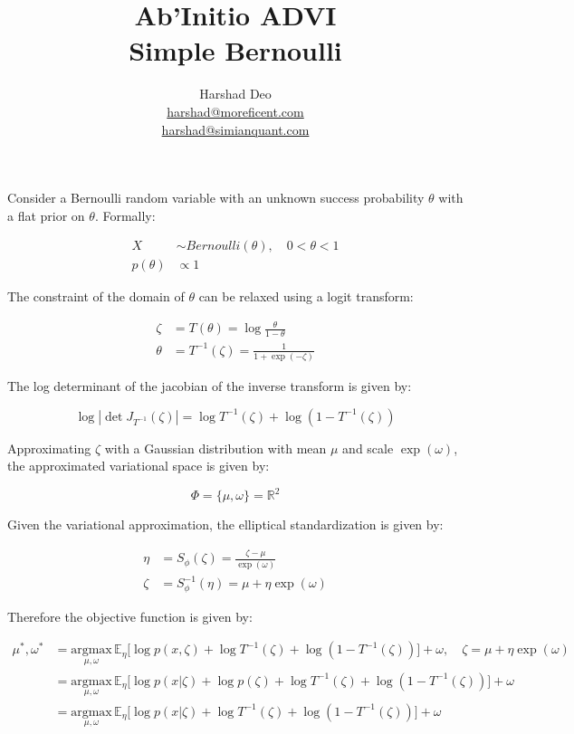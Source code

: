 \documentclass[10pt]{article}
\title{Ab'Initio ADVI \\ Simple Bernoulli}
\author{Harshad Deo \\ 
  \href{mailto:harshad@moreficent.com}{harshad@moreficent.com} \\ 
  \href{mailto:harshad@simianquant.com}{harshad@simianquant.com}
}
\date{}
\begin{document}
  
\maketitle

Consider a Bernoulli random variable with an unknown success probability $\theta$ with a flat prior on $\theta$. Formally:

\begin{align*}
  X &\sim Bernoulli(\theta), \quad 0 < \theta <1\\
  p(\theta) &\varpropto 1
\end{align*}

The constraint of the domain of $\theta$ can be relaxed using a logit transform:

\begin{align*}
  \zeta &= T(\theta) = \log \frac{\theta}{1 - \theta} \\
  \theta &= T^{-1}(\zeta) = \frac{1}{1 + \exp(-\zeta)}
\end{align*}

The log determinant of the jacobian of the inverse transform is given by:

\begin{equation*}
  \log|\det J_{T^{-1}}(\zeta)| = \log T^{-1}(\zeta) + \log(1 - T^{-1}(\zeta))
\end{equation*}


Approximating $\zeta$ with a Gaussian distribution with mean $\mu$ and scale $\exp(\omega)$, the approximated 
variational space is given by:

\begin{equation*}
  \Phi = \{\mu, \omega\} = \mathbb{R}^2
\end{equation*}

Given the variational approximation, the elliptical standardization is given by:

\begin{align*}
  \eta &= S_{\phi}(\zeta) = \frac{\zeta - \mu}{\exp(\omega)} \\
  \zeta &= S_{\phi}^{-1}(\eta) = \mu + \eta \exp(\omega)
\end{align*}

Therefore the objective function is given by:

\begin{align*}
  \mu^*, \omega^* &= \underset{\mu, \omega}{\text{argmax}}\,\mathbb{E}_\eta\big[\log p(x, \zeta) + \log T^{-1}(\zeta) + \log(1 - T^{-1}(\zeta)) \big] + \omega, \quad \zeta = \mu + \eta\exp(\omega) \\
  &= \underset{\mu, \omega}{\text{argmax}}\,\mathbb{E}_\eta\big[\log p(x | \zeta) + \log p(\zeta) + \log T^{-1}(\zeta) + \log(1 - T^{-1}(\zeta))] + \omega \\
  &= \underset{\mu, \omega}{\text{argmax}}\,\mathbb{E}_\eta\big[\log p(x | \zeta) + \log T^{-1}(\zeta) + \log(1 - T^{-1}(\zeta))] + \omega
\end{align*}
\end{document}
